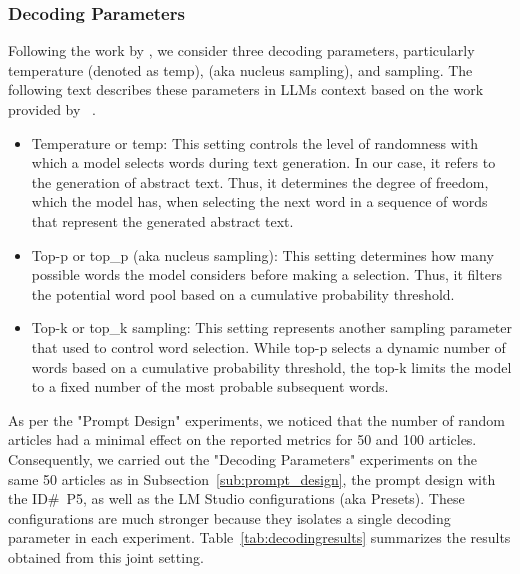 \documentclass[bdcc,article,submit,pdftex,moreauthors]{Definitions/mdpi}
\begin{document}
\subsubsection{Decoding Parameters}
\label{subs:dec_para}

Following the work by \citet{Hamed2026IC}, we consider three decoding parameters, particularly temperature (denoted as temp),  (aka nucleus sampling), and  sampling. 
The following text describes these parameters in LLMs context based on the work provided by ~\citet{nguyen2025turningheatminpsampling,chang2023kldivergenceguidedtemperaturesampling}.

\begin{itemize}
    \item Temperature or temp: This setting controls the level of randomness with which a model selects words during text generation. In our case, it refers to the generation of abstract text. Thus, it determines the degree of freedom, which the model has, when selecting the next word in a sequence of words that represent the generated abstract text.
    \item Top-p or top\_p (aka nucleus sampling): This setting determines how many possible words the model considers before making a selection. Thus, it filters the potential word pool based on a cumulative probability threshold.
    \item Top-k or top\_k sampling: This setting represents another sampling parameter that used to control word selection. While top-p selects a dynamic number of words based on a cumulative probability threshold, the top-k limits the model to a fixed number of the most probable subsequent words.
\end{itemize}

As per the "Prompt Design" experiments, we noticed that the number of random articles had a minimal effect on the reported metrics for 50 and 100 articles. 
Consequently, we carried out the "Decoding Parameters" experiments on the same 50 articles as in Subsection~\ref{sub:prompt_design},  the prompt design with the ID\#~P5, as well as the LM Studio configurations (aka Presets).
These configurations are much stronger because they isolates a single decoding parameter in each experiment. Table~\ref{tab:decodingresults} summarizes the results obtained from this joint setting.
\end{document}
